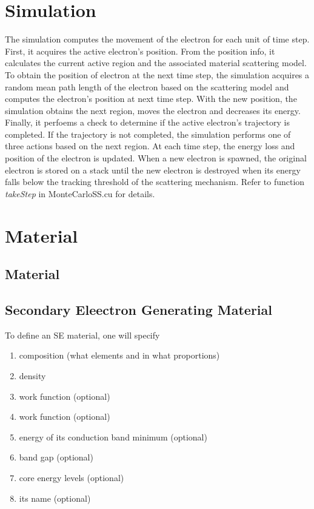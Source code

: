 \section{Simulation}\label{impl:sim}
The simulation computes the movement of the electron for each unit of time step. First, it acquires the active electron's position. From the position info, it calculates the current active region and the associated material scattering model. To obtain the position of electron at the next time step, the simulation acquires a random mean path length of the electron based on the scattering model and computes the electron's position at next time step. With the new position, the simulation obtains the next region, moves the electron and decreases its energy. Finally, it perfoems a check to determine if the active electron's trajectory is completed. If the trajectory is not completed, the simulation performs one of three actions based on the next region. At each time step, the energy loss and position of the electron is updated. When a new electron is spawned, the original electron is stored on a stack until the new electron is destroyed when its energy falls below the tracking threshold of the scattering mechanism. Refer to function \emph{takeStep} in MonteCarloSS.cu for details. 

\section{Material}\label{impl:mat}
\subsection{Material}
\subsection{Secondary Eleectron Generating Material}
To define an SE material, one will specify
\begin{enumerate}
\item composition (what elements and in what proportions)
\item density
\item work function (optional)
\item work function (optional)
\item energy of its conduction band minimum (optional)
\item band gap (optional)
\item core energy levels (optional)
\item its name (optional)
\end{enumerate}

